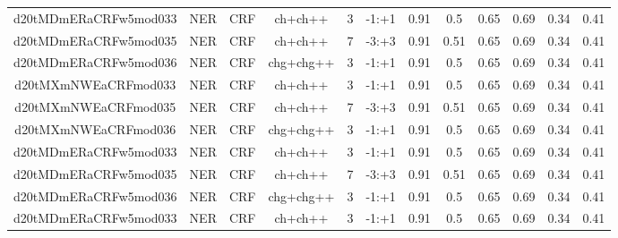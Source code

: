 \documentclass[a4paper]{article}
\begin{document}
\begin{landscape}
\begin{center}
\begin{tabular}{ |c|c|c|c|c|c|c|c|c|c|c|c|}
 
 	
 	\small{ d20tMDmERaCRFw5mod033 } & \small{ NER} & \small{  CRF }  & ch+ch++  &  3 &  \small{  -1:+1 }  &  0.91 & 0.5 & 0.65  &  0.69 & 0.34 & 0.41 \\
 	

 
 	
 	\small{ d20tMDmERaCRFw5mod035 } & \small{ NER} & \small{  CRF }  & ch+ch++  &  7 &  \small{  -3:+3 }  &  0.91 & 0.51 & 0.65  &  0.69 & 0.34 & 0.41 \\
 	

 
 	
 	\small{ d20tMDmERaCRFw5mod036 } & \small{ NER} & \small{  CRF }  & chg+chg++  &  3 &  \small{  -1:+1 }  &  0.91 & 0.5 & 0.65  &  0.69 & 0.34 & 0.41 \\
 	

 
 	
 	\small{ d20tMXmNWEaCRFmod033 } & \small{ NER} & \small{  CRF }  & ch+ch++  &  3 &  \small{  -1:+1 }  &  0.91 & 0.5 & 0.65  &  0.69 & 0.34 & 0.41 \\
 	

 
 	
 	\small{ d20tMXmNWEaCRFmod035 } & \small{ NER} & \small{  CRF }  & ch+ch++  &  7 &  \small{  -3:+3 }  &  0.91 & 0.51 & 0.65  &  0.69 & 0.34 & 0.41 \\
 	

 
 	
 	\small{ d20tMXmNWEaCRFmod036 } & \small{ NER} & \small{  CRF }  & chg+chg++  &  3 &  \small{  -1:+1 }  &  0.91 & 0.5 & 0.65  &  0.69 & 0.34 & 0.41 \\
 	

 
 	
 	\small{ d20tMDmERaCRFw5mod033 } & \small{ NER} & \small{  CRF }  & ch+ch++  &  3 &  \small{  -1:+1 }  &  0.91 & 0.5 & 0.65  &  0.69 & 0.34 & 0.41 \\
 	

 
 	
 	\small{ d20tMDmERaCRFw5mod035 } & \small{ NER} & \small{  CRF }  & ch+ch++  &  7 &  \small{  -3:+3 }  &  0.91 & 0.51 & 0.65  &  0.69 & 0.34 & 0.41 \\
 	

 
 	
 	\small{ d20tMDmERaCRFw5mod036 } & \small{ NER} & \small{  CRF }  & chg+chg++  &  3 &  \small{  -1:+1 }  &  0.91 & 0.5 & 0.65  &  0.69 & 0.34 & 0.41 \\
 	

 
 	
 	\small{ d20tMDmERaCRFw5mod033 } & \small{ NER} & \small{  CRF }  & ch+ch++  &  3 &  \small{  -1:+1 }  &  0.91 & 0.5 & 0.65  &  0.69 & 0.34 & 0.41 \\
 	


\end{tabular}
\end{center}
\end{landscape}
\end{document}
